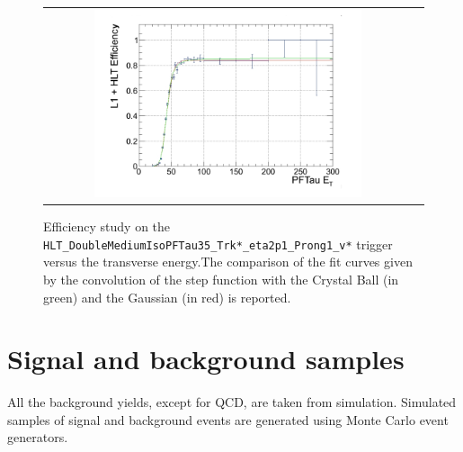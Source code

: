  	\begin{figure}[tbh!]
	\centering
	\begin{tabular}{cc}
		\includegraphics[width=0.75\textwidth]{analysis/pics/trigger_turnon.png}
	\end{tabular}
	\caption{Efficiency study on the \texttt{HLT\_\-DoubleMedium\-IsoPFTau35\_\-Trk*\_\-eta2p1\_\-Prong1\_\-v*} trigger versus the \hadtau transverse energy.The comparison of the fit curves given by the convolution of the step function with the Crystal Ball (in green) and the Gaussian (in red) is reported\cite{bib:dthesis:riccardoManzoni}.}
	\label{fig::trigger_turnon}
\end{figure}

\section{Signal and background samples}
\FloatBarrier



All the background yields, except for QCD, are taken from simulation. Simulated samples of signal and background events are generated using Monte Carlo event generators.


